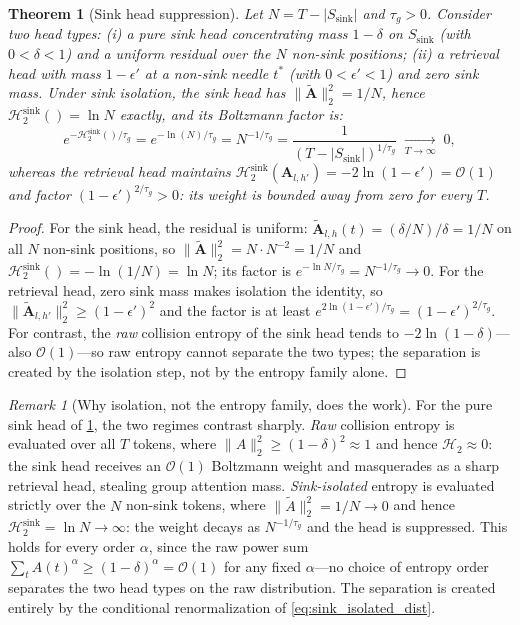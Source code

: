 \documentclass[final,5p,times,twocolumn]{elsarticle}
\newtheorem{theorem}{Theorem}
\theoremstyle{definition}
\theoremstyle{remark}
\newtheorem{remark}{Remark}
\newcommand{\Attn}[2]{\mathbf{A}_{#1,#2}}
\newcommand{\CollisionSink}[1]{\mathcal{H}^{\mathrm{sink}}_{2}\!\left(#1\right)}
\newcommand{\Ssink}{S_{\mathrm{sink}}}
\newcommand{\Hsink}{\mathcal{H}^{\mathrm{sink}}_{2}}
\begin{document}
\begin{theorem}[Sink head suppression]
\label{thm:sink_suppression}
Let $N = T - |\Ssink|$ and $\tau_g > 0$. Consider two head types:
\emph{(i)} a pure sink head concentrating mass $1-\delta$ on $\Ssink$ (with $0<\delta<1$) and a uniform residual over the $N$ non-sink
positions; \emph{(ii)} a retrieval head with mass $1-\epsilon'$ at a
non-sink needle $t^{*}$ (with $0<\epsilon'<1$) and zero sink mass.
Under sink isolation, the sink head has
 $\|\tilde{\mathbf{A}}\|_2^2 = 1/N$, hence
 $\CollisionSink{} = \ln N$ exactly, and its Boltzmann factor is:
\begin{equation}
e^{-\CollisionSink{}/\tau_g}
= e^{-\ln(N)/\tau_g}
= N^{-1/\tau_g}
= \frac{1}{(T - |\Ssink|)^{1/\tau_g}}
\;\xrightarrow[T \to \infty]{}\; 0,
\label{eq:sink_decay}
\end{equation}
whereas the retrieval head maintains
 $\CollisionSink{\Attn{l}{h'}} = -2\ln(1-\epsilon') = \mathcal{O}(1)$ and factor $(1-\epsilon')^{2/\tau_g} > 0$: its weight is bounded away
from zero for every $T$.
\end{theorem}

\begin{proof}
For the sink head, the residual is uniform:
 $\tilde{\mathbf{A}}_{l,h}(t) = (\delta/N)/\delta = 1/N$ on all $N$ non-sink positions, so $\|\tilde{\mathbf{A}}\|_2^2 = N \cdot N^{-2} = 1/N$ and $\CollisionSink{} = -\ln(1/N) = \ln N$; its factor is
 $e^{-\ln N/\tau_g} = N^{-1/\tau_g} \to 0$. For the retrieval head, zero
sink mass makes isolation the identity, so
 $\|\tilde{\mathbf{A}}_{l,h'}\|_2^2 \ge (1-\epsilon')^{2}$ and the factor
is at least $e^{2\ln(1-\epsilon')/\tau_g} = (1-\epsilon')^{2/\tau_g}$.
For contrast, the \emph{raw} collision entropy of the sink head tends
to $-2\ln(1-\delta)$---also $\mathcal{O}(1)$---so raw entropy cannot
separate the two types; the separation is created by the isolation
step, not by the entropy family alone.
\end{proof}

\begin{remark}[Why isolation, not the entropy family, does the work]
\label{rem:necessity}
For the pure sink head of \cref{thm:sink_suppression}, the two regimes
contrast sharply. \emph{Raw} collision entropy is evaluated over all
 $T$ tokens, where $\|A\|_2^2 \ge (1-\delta)^2 \approx 1$ and hence
 $\mathcal{H}_2 \approx 0$: the sink head receives an $\mathcal{O}(1)$ Boltzmann weight and masquerades as a sharp retrieval head, stealing
group attention mass. \emph{Sink-isolated} entropy is evaluated strictly
over the $N$ non-sink tokens, where $\|\tilde{A}\|_2^2 = 1/N \to 0$ and
hence $\Hsink = \ln N \to \infty$: the weight decays as $N^{-1/\tau_g}$ and the head is suppressed. This holds for every order $\alpha$, since
the raw power sum $\sum_t A(t)^\alpha \ge (1-\delta)^\alpha = \mathcal{O}(1)$ for any fixed $\alpha$---no choice of entropy order separates the two
head types on the raw distribution. The separation is created entirely
by the conditional renormalization of \cref{eq:sink_isolated_dist}.
\end{remark}
\end{document}
